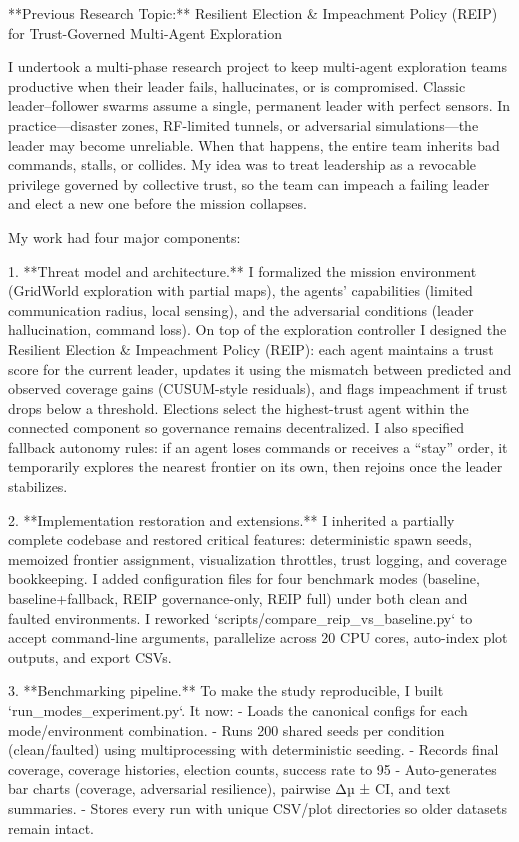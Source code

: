 **Previous Research Topic:** Resilient Election & Impeachment Policy (REIP) for Trust-Governed Multi-Agent Exploration

I undertook a multi-phase research project to keep multi-agent exploration teams productive when their leader fails, hallucinates, or is compromised. Classic leader–follower swarms assume a single, permanent leader with perfect sensors. In practice—disaster zones, RF-limited tunnels, or adversarial simulations—the leader may become unreliable. When that happens, the entire team inherits bad commands, stalls, or collides. My idea was to treat leadership as a revocable privilege governed by collective trust, so the team can impeach a failing leader and elect a new one before the mission collapses.

My work had four major components:

1. **Threat model and architecture.**  
   I formalized the mission environment (GridWorld exploration with partial maps), the agents’ capabilities (limited communication radius, local sensing), and the adversarial conditions (leader hallucination, command loss). On top of the exploration controller I designed the Resilient Election & Impeachment Policy (REIP): each agent maintains a trust score for the current leader, updates it using the mismatch between predicted and observed coverage gains (CUSUM-style residuals), and flags impeachment if trust drops below a threshold. Elections select the highest-trust agent within the connected component so governance remains decentralized. I also specified fallback autonomy rules: if an agent loses commands or receives a “stay” order, it temporarily explores the nearest frontier on its own, then rejoins once the leader stabilizes.

2. **Implementation restoration and extensions.**  
   I inherited a partially complete codebase and restored critical features: deterministic spawn seeds, memoized frontier assignment, visualization throttles, trust logging, and coverage bookkeeping. I added configuration files for four benchmark modes (baseline, baseline+fallback, REIP governance-only, REIP full) under both clean and faulted environments. I reworked `scripts/compare_reip_vs_baseline.py` to accept command-line arguments, parallelize across 20 CPU cores, auto-index plot outputs, and export CSVs.

3. **Benchmarking pipeline.**  
   To make the study reproducible, I built `run_modes_experiment.py`. It now:
   - Loads the canonical configs for each mode/environment combination.
   - Runs 200 shared seeds per condition (clean/faulted) using multiprocessing with deterministic seeding.
   - Records final coverage, coverage histories, election counts, success rate to 95%
   - Auto-generates bar charts (coverage, adversarial resilience), pairwise Δµ ± CI, and text summaries.
   - Stores every run with unique CSV/plot directories so older datasets remain intact.

